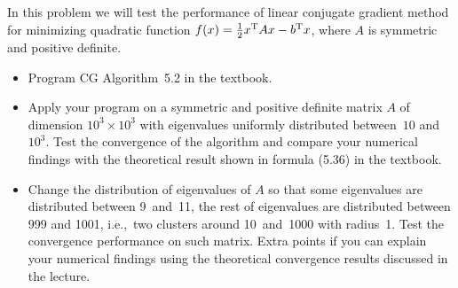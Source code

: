 \begin{problem}
  In this problem we will test the performance of linear conjugate gradient method for minimizing quadratic function $f(x) = \frac{1}{2}x^{\textrm{T}} Ax - b ^{\textrm{T}} x$, where $A$ is symmetric and positive definite.
  
  \begin{itemize}
    \item Program CG Algorithm~5.2 in the textbook.
    
    \item Apply your program on a symmetric and positive definite matrix $A$ of dimension $10^{3} \times 10^{3}$ with eigenvalues uniformly distributed between~$10$ and~$10^3$. Test the convergence of the algorithm and compare your numerical findings with the theoretical result shown in formula (5.36) in the textbook.
    
    \item Change the distribution of eigenvalues of $A$ so that some eigenvalues are distributed between 9~and~11, the rest of eigenvalues are distributed between 999 and 1001, i.e.,~two clusters around 10~and~1000 with radius~1. Test the convergence performance on such matrix. Extra points if you can explain your numerical findings using the theoretical convergence results discussed in the lecture.
  \end{itemize}
\end{problem}

